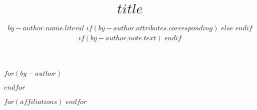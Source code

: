 \title{$title$}

$for(by-author)$
\author[$if(by-author.affiliations)$$for(by-author.affiliations)$$it.id$$sep$,$endfor$$endif$%
]{$by-author.name.literal$
$if(by-author.attributes.corresponding)$
$else$
$endif$
$if(by-author.note.text)$
$endif$
}
$endfor$

$for(affiliations)$
$endfor$

